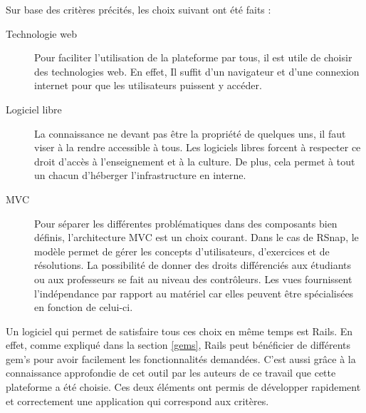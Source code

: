 Sur base des critères précités, les choix suivant ont été faits :
\begin{description}
  \item[Technologie web] Pour faciliter l'utilisation de la plateforme par tous, il est utile de choisir des technologies web. En effet, Il suffit d'un navigateur et d'une connexion internet pour que les utilisateurs puissent y accéder.
  \item[Logiciel libre] La connaissance ne devant pas être la propriété de quelques uns, il faut viser à la rendre accessible à tous. Les logiciels libres forcent à respecter ce droit d'accès à l'enseignement et à la culture. De plus, cela permet à tout un chacun d'héberger l'infrastructure en interne.
  \item[MVC] Pour séparer les différentes problématiques dans des composants bien définis, l'architecture MVC est un choix courant. Dans le cas de RSnap, le modèle permet de gérer les concepts d'utilisateurs, d'exercices et de résolutions. La possibilité de donner des droits différenciés aux étudiants ou aux professeurs se fait au niveau des contrôleurs. Les vues fournissent l'indépendance par rapport au matériel car elles peuvent être spécialisées en fonction de celui-ci.
\end{description}
Un logiciel qui permet de satisfaire tous ces choix en même temps est Rails. En effet, comme expliqué dans la section \ref{gems}, Rails peut bénéficier de différents gem's pour avoir facilement les fonctionnalités demandées. C'est aussi grâce à la connaissance approfondie de cet outil par les auteurs de ce travail que cette plateforme a été choisie. Ces deux éléments ont permis de développer rapidement et correctement une application qui correspond aux critères. 



